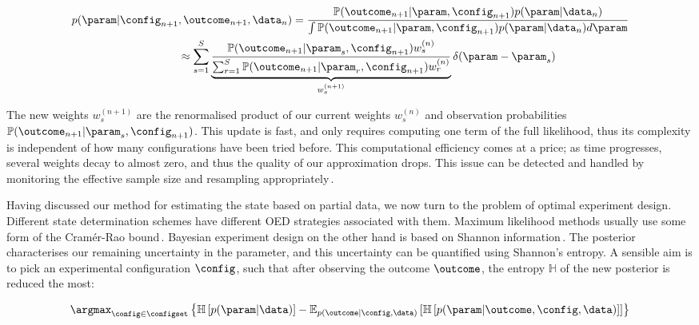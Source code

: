 \begin{align}
	p(\param\vert\config_{n+1}&,\outcome_{n+1},\data_n) = \frac{\mathbb{P}(\outcome_{n+1}\vert\param,\config_{n+1})p(\param\vert\data_n)}{\int \mathbb{P}(\outcome_{n+1}\vert\param,\config_{n+1})p(\param\vert\data_n) d\param}\label{eqn:SISupdate}\\
	&\approx \sum_{s=1}^{S}\underbrace{\frac{\mathbb{P}(\outcome_{n+1}\vert\param_s,\config_{n+1})w^{(n)}_s}{\sum_{r=1}^{S}\mathbb{P}(\outcome_{n+1}\vert\param_r,\config_{n+1})w^{(n)}_r}}_{w^{(n+1)}_s}\delta(\param-\param_s)\notag
\end{align}

The new weights $w^{(n+1)}_s$ are the renormalised product of our current weights $w^{(n)}_s$ and observation probabilities $\mathbb{P}(\outcome_{n+1}\vert\param_s,\config_{n+1})$. This update is fast, and only requires computing one term of the full likelihood, thus its complexity is independent of how many configurations have been tried before. This computational efficiency comes at a price; as time progresses, several weights decay to almost zero, and thus the quality of our approximation drops. This issue can be detected and handled by monitoring the effective sample size and resampling appropriately\,\cite{SMCBook}.

Having discussed our method for estimating the state based on partial data, we now turn to the problem of optimal experiment design. Different state determination schemes have different OED strategies associated with them. Maximum likelihood methods usually use some form of the Cram\'{e}r-Rao bound\,\cite{OEDFirst,OEDAverage}. Bayesian experiment design on the other hand is based on Shannon information\,\cite{MUBFirst,ExactInformation}. The posterior characterises our remaining uncertainty in the parameter, and this uncertainty can be quantified using Shannon's entropy. A sensible aim is to pick an experimental configuration $\config$, such that after observing the outcome $\outcome$, the entropy $\mathbb{H}$ of the new posterior is reduced the most:

\begin{equation}
\argmax_{\config\in\configset} \left\{ \mathbb{H}\left[p(\param|\data)\right] - \mathbb{E}_{p(\outcome\vert\config,\data)}\left[\mathbb{H}\left[ p(\param|\outcome,\config,\data) \right] \right]\right\}\label{eqn:expectedentropyreduction}
\end{equation} 


